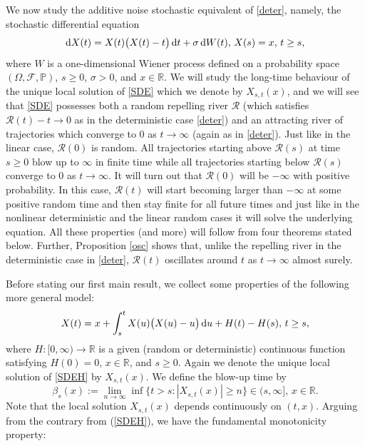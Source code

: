 \documentclass[sn-mathphys-num]{sn-jnl}
\theoremstyle{definition}
\newcommand{\scr}[1]{\mathscr #1}
\numberwithin{equation}{section} \theoremstyle{remark}
\renewcommand{\d}{\hbox{d}}
\def\R{\mathbb R}
\def\d{\text{\rm{d}}} \def\bb{\beta} \def\aa{\alpha} \def\D{\scr D}
\def\RR{\mathscr R}
\def\F{\scr F}
\def\P{\mathbb P}
\newcommand{\1}{\mathbbm{1}}
\begin{document}
We now study the additive noise stochastic equivalent of \eqref{deter},
namely, the stochastic differential equation
\begin{equation}\label{SDE}
\d X(t)=X(t)\big(X(t)-t\big)\,\d t + \sigma\,\d W(t), \,X(s)=x,\,t \geq s,
\end{equation}
where $W$ is a one-dimensional Wiener process defined on a probability
space $(\Omega,\F,\P)$, $s \geq 0$, $\sigma>0$, and $x \in \R$.  We
will study the long-time behaviour of the unique local solution of
\eqref{SDE} which we denote by $X_{s,t}(x)$, and we will see that
\eqref{SDE} possesses both a random repelling river $\RR$ (which
satisfies $\RR(t)-t \to 0$ as in the deterministic case \eqref{deter})
and an attracting river of trajectories which converge to 0 as
$t \to \infty$ (again as in \eqref{deter}). Just like in the linear
case, $\RR(0)$ is random.  All trajectories starting above $\RR(s)$ at
time $s \geq 0$ blow up to $\infty$ in finite time while all
trajectories starting below $\RR(s)$ converge to 0 as $t \to
\infty$. It will turn out that $\RR(0)$ will be $-\infty$ with
positive probability. In this case, $\RR(t)$ will start becoming
larger than $-\infty$ at some positive random time and then stay
finite for all future times and just like in the nonlinear
deterministic and the linear random cases it will solve the underlying
equation. All these properties (and more) will follow from four
theorems stated below. Further, Proposition \ref{osc} shows that,
unlike the repelling river in the deterministic case in \eqref{deter},
$\RR(t)$ oscillates around $t$ as $t \to \infty$ almost surely.





Before stating our first main result, we collect some 
properties of the following more general model:
\begin{equation}\label{SDEH}
X(t)=x+\int_s^t X(u)\big(X(u)-u\big)\,\d u + H(t)-H(s),\,t \geq s,
\end{equation}
where $H:[0,\infty)\to \R$ is a given (random or deterministic) continuous function satisfying $H(0)=0$, $x \in \R$, and 
$s \geq 0$. Again we denote the unique local solution  of \eqref{SDEH}
by $X_{s,t}(x)$.
We define the blow-up time by
$$
\beta_s(x):=\lim_{n \to\infty}\inf\{t >s: |X_{s,t}(x)|\geq n\}\in
(s,\infty],\,x \in \R.
$$
Note that the local solution  $X_{s,t}(x)$ depends continuously on $(t,x)$. 
Arguing from the contrary from (\ref{SDEH}), we have the
fundamental monotonicity property:
\end{document}

